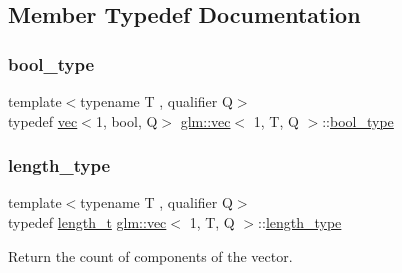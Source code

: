 \subsection{Member Typedef Documentation}
\mbox{\label{structglm_1_1vec_3_011_00_01_t_00_01_q_01_4_abf395a27aa73d1032bd2810013358668}} 
\subsubsection{\texorpdfstring{bool\+\_\+type}{bool\_type}}
{\footnotesize\ttfamily template$<$typename T , qualifier Q$>$ \\
typedef \hyperlink{structglm_1_1vec}{vec}$<$1, bool, Q$>$ \hyperlink{structglm_1_1vec}{glm\+::vec}$<$ 1, T, Q $>$\+::\hyperlink{structglm_1_1vec_3_011_00_01_t_00_01_q_01_4_abf395a27aa73d1032bd2810013358668}{bool\+\_\+type}}

\mbox{\label{structglm_1_1vec_3_011_00_01_t_00_01_q_01_4_a37415eee3b59cf93cdb752a2b30fe5e6}} 
\subsubsection{\texorpdfstring{length\+\_\+type}{length\_type}}
{\footnotesize\ttfamily template$<$typename T , qualifier Q$>$ \\
typedef \hyperlink{namespaceglm_a090a0de2260835bee80e71a702492ed9}{length\+\_\+t} \hyperlink{structglm_1_1vec}{glm\+::vec}$<$ 1, T, Q $>$\+::\hyperlink{structglm_1_1vec_3_011_00_01_t_00_01_q_01_4_a37415eee3b59cf93cdb752a2b30fe5e6}{length\+\_\+type}}



Return the count of components of the vector. 

\mbox{\label{structglm_1_1vec_3_011_00_01_t_00_01_q_01_4_acc52e9f1fce6c99322df114842a855dd}} 

